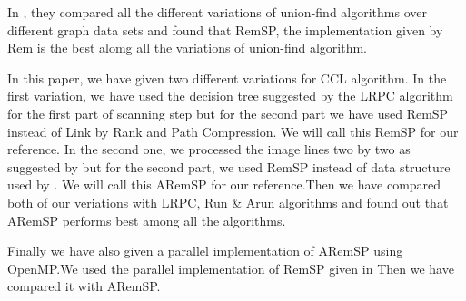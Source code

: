 In \cite{Patwary2010_RemSP}, they compared all the different variations of union-find algorithms over different graph data 
sets and found that RemSP, the implementation given by Rem is the best alomg all the variations of union-find algorithm.

In this paper, we have given two different variations for CCL algorithm. In the first variation, we have used the decision
tree suggested by the LRPC algorithm for the first part of scanning step but for the second part we have used RemSP 
instead of Link by Rank and Path Compression. We will call this RemSP for our reference.
In the second one, we processed the image lines two by two as suggested by \cite{He2012_ARun} but for the second part, we
used RemSP instead of data structure used by \cite{He2012_ARun}. We will call this ARemSP for our reference.Then we have
compared both of our veriations with LRPC, Run & Arun algorithms and found out that ARemSP performs best among all the 
algorithms.

Finally we have also given a parallel implementation of ARemSP using OpenMP.We used the parallel implementation of RemSP
given in \cite{Patwary2012_PARemSP} Then we have compared it with ARemSP.
